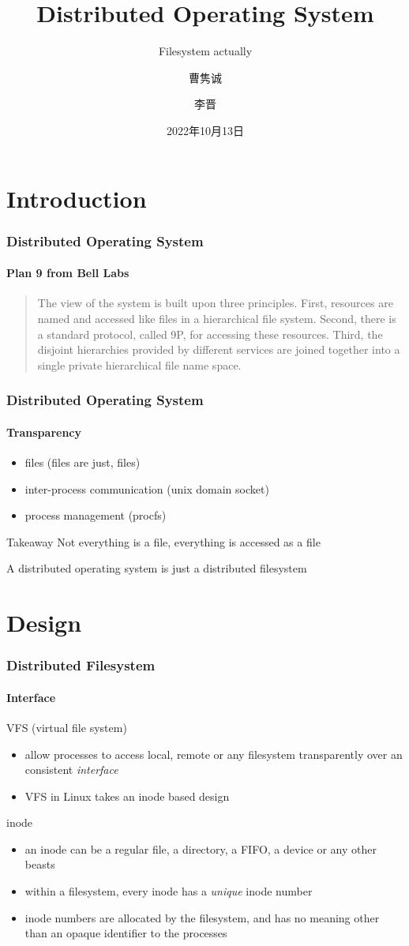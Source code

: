\documentclass{ctexbeamer}
\title{Distributed Operating System}
\subtitle{Filesystem actually}
\author{曹隽诚 \and 李晋}
\date{2022年10月13日}
\begin{document}
\frame{\titlepage}

\section{Introduction}

\begin{frame}
\frametitle{Distributed Operating System}
\framesubtitle{Plan 9 from Bell Labs}
\begin{quotation}
The view of the system is built upon three principles. First, resources are named and accessed like files in a hierarchical file system. Second, there is a standard protocol, called 9P, for accessing these resources. Third, the disjoint hierarchies provided by different services are joined together into a single private hierarchical file name space.
\end{quotation}
\end{frame}

\begin{frame}
\frametitle{Distributed Operating System}
\framesubtitle{Transparency}
\begin{itemize}
  \item files (files are just, files)
  \item inter-process communication (unix domain socket)
  \item process management (procfs)
\end{itemize}
\begin{block}{Takeaway}
  Not everything is a file, everything is accessed as a file

  A distributed operating system is just a distributed filesystem
\end{block}
\end{frame}

\section{Design}
\begin{frame}
\frametitle{Distributed Filesystem}
\framesubtitle{Interface}
\begin{block}{VFS (virtual file system)}
  \begin{itemize}
    \item allow processes to access local, remote or any filesystem transparently over an consistent \emph{interface}
    \item VFS in Linux takes an inode based design
  \end{itemize}
\end{block}
\begin{block}{inode}
  \begin{itemize}
    \item an inode can be a regular file, a directory, a FIFO, a device or any other beasts
    \item within a filesystem, every inode has a \emph{unique} inode number
    \item inode numbers are allocated by the filesystem, and has no meaning other than an opaque identifier to the processes
  \end{itemize}
\end{block}
\end{frame}
\end{document}
